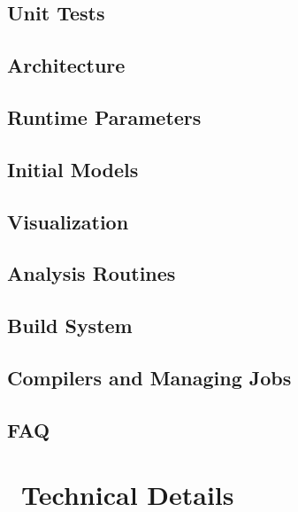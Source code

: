 \documentclass[11pt]{book}    %
\begin{document}
\chapter{Unit Tests}


\chapter{Architecture}


\chapter{Runtime Parameters}
\label{ch:runtimeparameters}



\chapter{Initial Models}


\chapter{Visualization}


\chapter{Analysis Routines}


\chapter{Build System}


\chapter{Compilers and Managing Jobs}


\chapter{FAQ}


\part{\maestro\ Technical Details}
\end{document}
